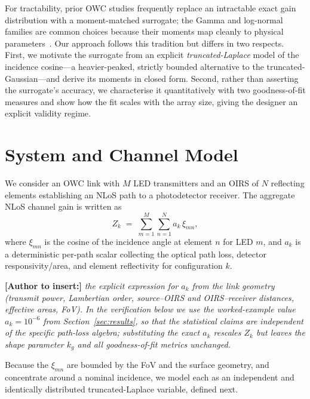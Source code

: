 \documentclass[conference]{IEEEtran}
\begin{document}
For tractability, prior OWC studies frequently replace an intractable exact
gain distribution with a moment-matched surrogate; the Gamma and log-normal
families are common choices because their moments map cleanly to physical
parameters~\cite{papoulis2002}. Our approach follows this tradition but
differs in two respects. First, we motivate the surrogate from an explicit
\emph{truncated-Laplace} model of the incidence cosine---a heavier-peaked,
strictly bounded alternative to the truncated-Gaussian---and derive its
moments in closed form. Second, rather than asserting the surrogate's
accuracy, we characterise it quantitatively with two goodness-of-fit measures
and show how the fit scales with the array size, giving the designer an
explicit validity regime.

\section{System and Channel Model}
\label{sec:model}
We consider an OWC link with $M$ LED transmitters and an OIRS of $N$
reflecting elements establishing an NLoS path to a photodetector receiver.
The aggregate NLoS channel gain is written as
\begin{equation}
Z_k \;=\; \sum_{m=1}^{M}\sum_{n=1}^{N} a_k \,\xi_{mn},
\label{eq:agg}
\end{equation}
where $\xi_{mn}$ is the cosine of the incidence angle at element $n$ for LED
$m$, and $a_k$ is a deterministic per-path scalar collecting the optical
path loss, detector responsivity/area, and element reflectivity for
configuration $k$.

\noindent\textbf{[Author to insert:]} \emph{the explicit expression for
$a_k$ from the link geometry (transmit power, Lambertian order, source--OIRS
and OIRS--receiver distances, effective areas, FoV). In the verification
below we use the worked-example value $a_k=10^{-6}$ from
Section~\ref{sec:results}, so that the statistical claims are independent of
the specific path-loss algebra; substituting the exact $a_k$ rescales
$Z_k$ but leaves the shape parameter $k_g$ and all goodness-of-fit metrics
unchanged.}

Because the $\xi_{mn}$ are bounded by the FoV and the surface geometry, and
concentrate around a nominal incidence, we model each as an independent and
identically distributed truncated-Laplace variable, defined next.
\end{document}

